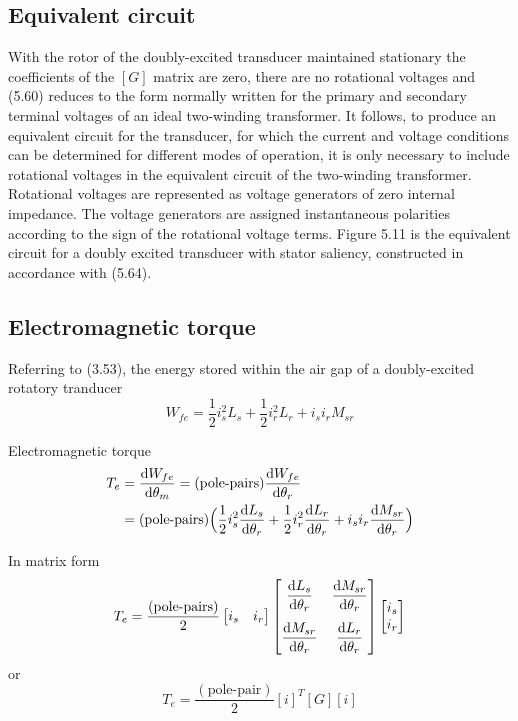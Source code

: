 \documentclass[a4paper,numbers=noenddot,12pt]{scrbook}
\begin{document}
    \subsection{Equivalent circuit}
    With the rotor of the doubly-excited transducer maintained stationary the coefficients of the $[G]$ matrix are zero, there are no rotational voltages and (5.60) reduces to the form normally written for the primary and secondary terminal voltages of an ideal two-winding transformer. It follows, to produce an equivalent circuit for the transducer, for which the current and voltage conditions can be determined for different modes of operation, it is only necessary to include rotational voltages in the equivalent circuit of the two-winding transformer. Rotational voltages are represented as voltage generators of zero internal impedance. The voltage generators are assigned instantaneous polarities according to the sign of the rotational voltage terms.
    Figure 5.11 is the equivalent circuit for a doubly excited transducer with stator saliency, constructed in accordance with (5.64).
    \subsection{Electromagnetic torque}
    Referring to (3.53), the energy stored within the air gap of a doubly-excited rotatory tranducer
    \begin{equation*}
        W_{fe} = \frac{1}{2} i_s^2 L_s + \frac{1}{2} i_r^2 L_r + i_s i_r M_{sr}
    \end{equation*}

    Electromagnetic torque
    \begin{align}
        T_e & = \frac{\dif W_{fe}}{\dif \theta_m} = (\text{pole-pairs}) \frac{\dif W_{fe}}{\dif \theta_r} \nonumber \\
        & = (\text{pole-pairs})\Big( \frac{1}{2}i_s^2 \frac{\dif L_s}{\dif \theta_r} + \frac{1}{2}i_r^2 \frac{\dif L_r}{\dif \theta_r}  +i_s i_r \frac{\dif M_{sr}}{\dif \theta_r}  \Big)
    \end{align}

    In matrix form
    \begin{equation}
        T_e = \frac{(\text{pole-pairs})}{2}
        \begin{bmatrix}
            i_s & i_r
        \end{bmatrix}
        \begin{bmatrix}
            \dfrac{\dif L_s}{\dif \theta_r} & \dfrac{\dif M_{sr}}{\dif \theta_r} \\[3ex] 
            \dfrac{\dif M_{sr}}{\dif \theta_r} & \dfrac{\dif L_{r}}{\dif \theta_r} 
        \end{bmatrix}
        \begin{bmatrix}
            i_s \\ i_r
        \end{bmatrix}
    \end{equation}
    or
    \begin{equation}
        T_e = \frac{(\text{pole-pair})}{2}{[i]}^T[G][i] %
    \end{equation}
\end{document}
